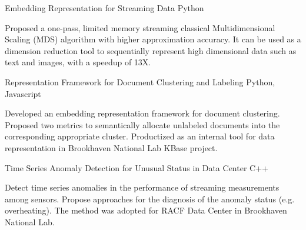 


\begin{cventries}


\projentry
{Embedding Representation for Streaming Data} %
{Python} %
{ 
\begin{cvitems}
\item{Proposed a one-pass, limited memory streaming classical Multidimensional Scaling ({MDS}) algorithm with higher approximation accuracy. It can be used as a dimension reduction tool to sequentially represent high dimensional data such as text and images, with a speedup of 13X.}
\end{cvitems}
}



\projentry
{Representation Framework for Document Clustering and Labeling} %
{Python, Javascript} %
{ 
\begin{cvitems}
\item{Developed an embedding representation framework for document clustering. Proposed two metrics to semantically allocate unlabeled documents into the corresponding appropriate cluster. Productized as an internal tool for data representation in Brookhaven National Lab KBase project.}
\end{cvitems}
}


\projentry
{Time Series Anomaly Detection for Unusual Status in Data Center} %
{C++} %
{ %
\begin{cvitems}
\item{Detect time series anomalies in the performance of streaming measurements among sensors. Propose approaches for the diagnosis of the anomaly status (e.g. overheating). The method was adopted for RACF Data Center in Brookhaven National Lab.}
\end{cvitems}
}


\end{cventries}
